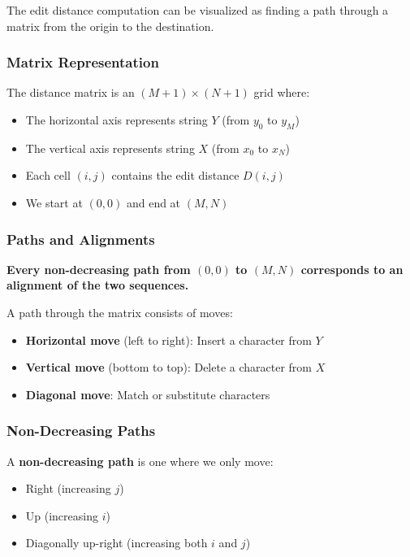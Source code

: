 \documentclass[11pt,a4paper]{article}
\theoremstyle{definition}
\theoremstyle{plain}
\theoremstyle{remark}
\begin{document}
The edit distance computation can be visualized as finding a path through a matrix from the origin to the destination.

\subsubsection{Matrix Representation}

The distance matrix is an $(M+1) \times (N+1)$ grid where:
\begin{itemize}
    \item The horizontal axis represents string $Y$ (from $y_0$ to $y_M$)
    \item The vertical axis represents string $X$ (from $x_0$ to $x_N$)
    \item Each cell $(i,j)$ contains the edit distance $D(i,j)$
    \item We start at $(0,0)$ and end at $(M,N)$
\end{itemize}

\subsubsection{Paths and Alignments}

\textbf{Every non-decreasing path from $(0,0)$ to $(M,N)$ corresponds to an alignment of the two sequences.}

A path through the matrix consists of moves:
\begin{itemize}
    \item \textbf{Horizontal move} (left to right): Insert a character from $Y$
    \item \textbf{Vertical move} (bottom to top): Delete a character from $X$
    \item \textbf{Diagonal move}: Match or substitute characters
\end{itemize}

\subsubsection{Non-Decreasing Paths}

A \textbf{non-decreasing path} is one where we only move:
\begin{itemize}
    \item Right (increasing $j$)
    \item Up (increasing $i$)
    \item Diagonally up-right (increasing both $i$ and $j$)
\end{itemize}
\end{document}
